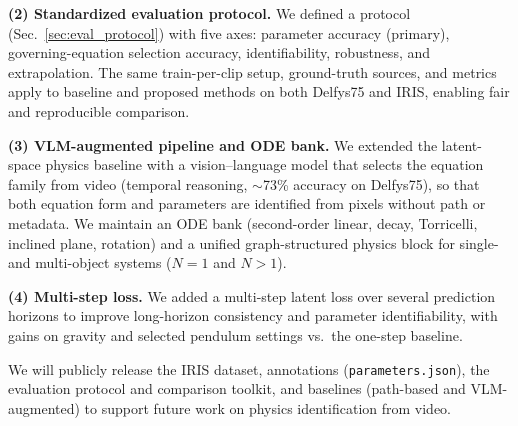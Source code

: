 \textbf{(2) Standardized evaluation protocol.} We defined a protocol (Sec.~\ref{sec:eval_protocol}) with five axes: parameter accuracy (primary), governing-equation selection accuracy, identifiability, robustness, and extrapolation. The same train-per-clip setup, ground-truth sources, and metrics apply to baseline and proposed methods on both Delfys75 and IRIS, enabling fair and reproducible comparison.

\textbf{(3) VLM-augmented pipeline and ODE bank.} We extended the latent-space physics baseline with a vision--language model that selects the equation family from video (temporal reasoning, $\sim$73\% accuracy on Delfys75), so that both equation form and parameters are identified from pixels without path or metadata. We maintain an ODE bank (second-order linear, decay, Torricelli, inclined plane, rotation) and a unified graph-structured physics block for single- and multi-object systems ($N=1$ and $N>1$).

\textbf{(4) Multi-step loss.} We added a multi-step latent loss over several prediction horizons to improve long-horizon consistency and parameter identifiability, with gains on gravity and selected pendulum settings vs.\ the one-step baseline.

We will publicly release the IRIS dataset, annotations (\texttt{parameters.json}), the evaluation protocol and comparison toolkit, and baselines (path-based and VLM-augmented) to support future work on physics identification from video.
